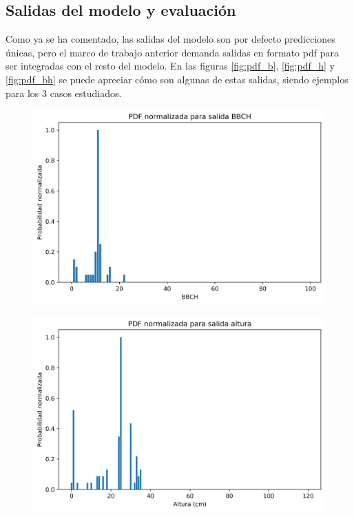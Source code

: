 \subsection{Salidas del modelo y evaluación}
Como ya se ha comentado, las salidas del modelo son por defecto predicciones únicas, pero el marco de trabajo anterior demanda salidas en formato \gls{pdf} para ser integradas con el resto del modelo. En las figuras \ref{fig:pdf_b}, \ref{fig:pdf_h} y \ref{fig:pdf_bh} se puede apreciar cómo son algunas de estas salidas, siendo ejemplos para los 3 casos estudiados. 
\\
\begin{figure}[h]
\centering
\includegraphics[width=0.9\linewidth]{archivos/tfg/Mean/TEST_PARC_PDF}
\end{figure}%
\begin{figure}
\centering
\includegraphics[width=0.9\linewidth]{archivos/tfg/Mean/TEST_PARC_PDF_H}
\end{figure}

